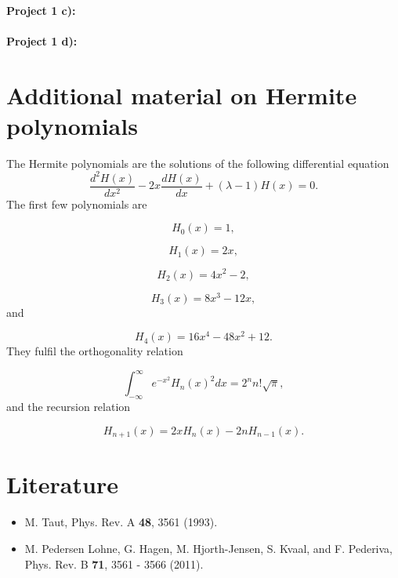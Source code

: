 \documentclass[%
oneside,                 %
final,                   %
10pt]{article}
\begin{document}
\paragraph{Project 1 c):}
\paragraph{Project 1 d):}
\section*{Additional material on Hermite polynomials}

The Hermite polynomials are the solutions of the following differential
equation
\begin{equation}
   \frac{d^2H(x)}{dx^2}-2x\frac{dH(x)}{dx}+
       (\lambda-1)H(x)=0.
   \label{eq:hermite}
\end{equation}
The first few polynomials are

\begin{equation*}
   H_0(x)=1,
\end{equation*}

\begin{equation*}
    H_1(x)=2x,
\end{equation*}

\begin{equation*}
    H_2(x)=4x^2-2,
\end{equation*}

\begin{equation*}
    H_3(x)=8x^3-12x,
\end{equation*}
and

\begin{equation*}
    H_4(x)=16x^4-48x^2+12.
\end{equation*}
They fulfil the orthogonality relation

\begin{equation*}
  \int_{-\infty}^{\infty}e^{-x^2}H_n(x)^2dx=2^nn!\sqrt{\pi},
\end{equation*}
and the recursion relation

\begin{equation*}
  H_{n+1}(x)=2xH_{n}(x)-2nH_{n-1}(x).
\end{equation*}




\section*{Literature}

\begin{itemize}
  \item M. Taut, Phys. Rev. A \textbf{48}, 3561 (1993).

  \item M. Pedersen Lohne, G. Hagen, M. Hjorth-Jensen, S. Kvaal, and F. Pederiva, Phys. Rev. B \textbf{71}, 3561 - 3566 (2011).
\end{itemize}
\end{document}
